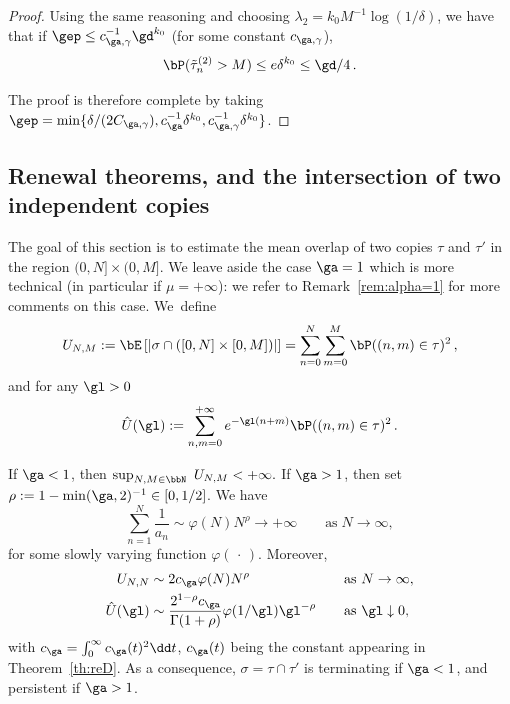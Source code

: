 \begin{appendix}
\begin{proof}
Using the same reasoning and choosing $\lambda_2 = k_0 M^{-1} \log (1/\delta)$, we have that if $\gep\leq c_{\ga,\gamma}^{-1} \gd^{k_0}$ (for some constant $c_{\ga,\gamma}$),
\begin{equation}
\bP(\tilde{\tau}^{(2)}_n > M) \le e \delta^{k_0} \leq \gd/4\,.
\end{equation}

The proof is therefore complete by taking $\gep = \min \lbrace \delta / (2 C_{\ga,\gamma}), c_{\ga}^{-1} \delta^{k_0}, c_{\ga,\gamma}^{-1} \delta^{k_0} \rbrace$.
\end{proof}

\subsection{Renewal theorems, and the intersection of two independent copies}

The goal of this section is to estimate the mean overlap of two copies $\tau$ and $\tau'$ in the region $(0,N]\times (0,M]$. We leave aside the case $\ga=1$ which is more technical (in particular if $\mu=+\infty$): we refer to Remark~\ref{rem:alpha=1} for more comments on this case. We~define
\begin{equation}\label{eq:UNM}
U_{N,M}:= \bE\left[\left| \sigma\cap \left([0,N]\times [0,M]\right) \right|\right] =\sum_{n=0}^{N} \sum_{m=0}^{M} \bP((n,m)\in\tau)^2\,,
\end{equation}
and for any $\gl>0$
\begin{equation}
\hat U (\gl) := \sum_{n,m=0}^{+\infty} e^{-\gl (n+m)} \bP((n,m)\in\tau)^2\,.
\end{equation}

\begin{prop}\label{prop:transience}
If $\ga<1$, then $\sup_{N,M\in\bbN} \ U_{N,M} <+\infty.$ If $\ga>1$, then set $\rho:=1-\min(\ga,2)^{-1} \in [0,1/2]$. We have
\begin{equation}\label{suman}
\sum_{n=1}^N \frac{1}{a_n} \sim \varphi(N) N^{\rho} \to +\infty \qquad \text{as}\;N\to\infty,
\end{equation}
for some slowly varying function $ \varphi ({\,\cdot\,})$. Moreover,
\begin{equation}\label{eq:asympUn}
\begin{aligned}
U_{N,N}&\sim 2 c_{\ga} \varphi(N) N^{\rho} &&\quad \text{as } N\to\infty, \\
\hat U(\gl) & \sim \frac{2^{1-\rho} c_{\ga}}{\Gamma(1+\rho)} \varphi(1/\gl) \gl^{-\rho} &&\quad \text{as } \gl\downarrow 0,
\end{aligned}
\end{equation}
with $c_{\ga} = \int_{0}^{\infty} c_{\ga}(t)^2 \dd t$, $c_{\ga}(t)$ being the constant appearing in Theorem~\ref{th:reD}.
As a consequence, $\sigma=\tau\cap\tau'$ is terminating if $\ga<1$, and persistent if $\ga> 1$.
\end{prop}


\end{appendix}
